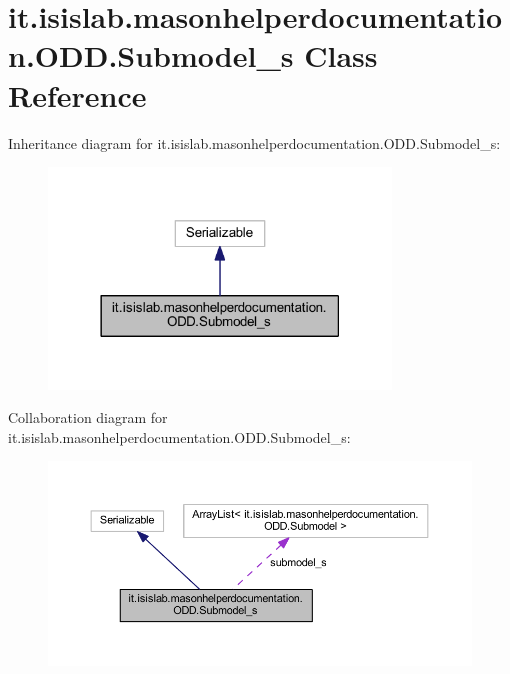 \hypertarget{classit_1_1isislab_1_1masonhelperdocumentation_1_1_o_d_d_1_1_submodel__s}{\section{it.\-isislab.\-masonhelperdocumentation.\-O\-D\-D.\-Submodel\-\_\-s Class Reference}
\label{classit_1_1isislab_1_1masonhelperdocumentation_1_1_o_d_d_1_1_submodel__s}
}


Inheritance diagram for it.\-isislab.\-masonhelperdocumentation.\-O\-D\-D.\-Submodel\-\_\-s\-:\nopagebreak
\begin{figure}[H]
\begin{center}
\leavevmode
\includegraphics[width=258pt]{classit_1_1isislab_1_1masonhelperdocumentation_1_1_o_d_d_1_1_submodel__s__inherit__graph}
\end{center}
\end{figure}


Collaboration diagram for it.\-isislab.\-masonhelperdocumentation.\-O\-D\-D.\-Submodel\-\_\-s\-:\nopagebreak
\begin{figure}[H]
\begin{center}
\leavevmode
\includegraphics[width=350pt]{classit_1_1isislab_1_1masonhelperdocumentation_1_1_o_d_d_1_1_submodel__s__coll__graph}
\end{center}
\end{figure}
